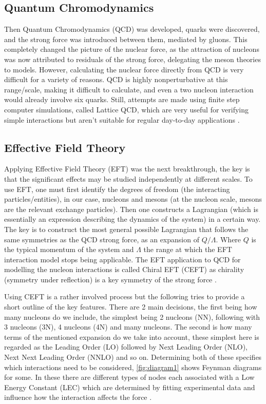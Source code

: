 \subsection{Quantum Chromodynamics}
Then Quantum Chromodynamics (QCD) was developed, quarks were discovered, and the strong force was introduced between them, mediated by gluons.
This completely changed the picture of the nuclear force, as the attraction of nucleons was now attributed to residuals of the strong force, delegating the meson theories to models.
However, calculating the nuclear force directly from QCD is very difficult for a variety of reasons. QCD is highly nonperturbative at this range/scale, making it difficult to calculate, and even a two nucleon interaction would already involve six quarks.
Still, attempts are made using finite step computer simulations, called Lattice QCD, which are very useful for verifying simple interactions but aren't suitable for regular day-to-day applications \cite{machleidt_nuclear_2013,hergert_guided_2020}.

\subsection{Effective Field Theory}
Applying Effective Field Theory (EFT) was the next breakthrough, the key is that the significant effects may be studied independently at different scales.
To use EFT, one must first identify the degrees of freedom (the interacting particles/entities), in our case, nucleons and mesons (at the nucleon scale, mesons are the relevant exchange particles).
Then one constructs a Lagrangian (which is essentially an expression describing the dynamics of the system) in a certain way.
The key is to construct the most general possible Lagrangian that follows the same symmetries as the QCD strong force, as an expansion of $Q/\Lambda$.
Where $Q$ is the typical momentum of the system and $\Lambda$ the range at which the EFT interaction model stops being applicable.
The EFT application to QCD for modelling the nucleon interactions is called Chiral EFT (CEFT) as chirality (symmetry under reflection) is a key symmetry of the strong force \cite{machleidt_chiral_2011, machleidt_nuclear_2013, burgess_introduction_2007, hergert_guided_2020}.

Using CEFT is a rather involved process but the following tries to provide a short outline of the key features.
There are 2 main decisions, the first being how many nucleons do we include, the simplest being 2 nucleons (NN), following with 3 nucleons (3N), 4 nucleons (4N) and many nucleons.
The second is how many terms of the mentioned expansion do we take into account, these simplest here is regarded as the Leading Order (LO) followed by Next Leading Order (NLO), Next Next Leading Order (NNLO) and so on.
Determining both of these specifies which interactions need to be considered, \cref{fig:diagram1} shows Feynman diagrams for some.
In these there are different types of nodes each associated with a Low Energy Constant (LEC) which are determined by fitting experimental data and influence how the interaction affects the force \cite{machleidt_chiral_2011, machleidt_nuclear_2013, burgess_introduction_2007, hergert_guided_2020}.

